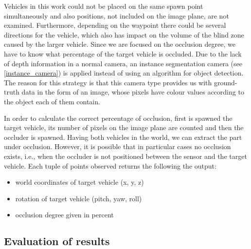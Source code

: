Vehicles in this work could not be placed on the same spawn point simultaneously and also positions, not included on the image plane, are not examined. Furthermore, depending on the waypoint there could be several directions for the vehicle, which also has impact on the volume of the blind zone caused by the larger vehicle. Since we are focused on the occlusion degree, we have to know what percentage of the target vehicle is occluded. Due to the lack of depth information in a normal camera, an instance segmentation camera (see \ref{instance_camera}) is applied instead of using an algorithm for object detection. The reason for this strategy is that this camera type provides us with ground-truth data in the form of an image, whose pixels have colour values according to the object each of them contain. 

In order to calculate the correct percentage of occlusion, first is spawned the target vehicle, its number of pixels on the image plane are counted and then the occluder is spawned. Having both vehicles in the world, we can extract the part under occlusion. However, it is possible that in particular cases no occlusion exists, i.e., when the occluder is not positioned between the sensor and the target vehicle. Each tuple of points observed returns the following the output:
\begin{itemize}
    \item world coordinates of target vehicle (x, y, z)
    \item rotation of target vehicle (pitch, yaw, roll)
    \item occlusion degree given in percent
\end{itemize}

\subsection{Evaluation of results}